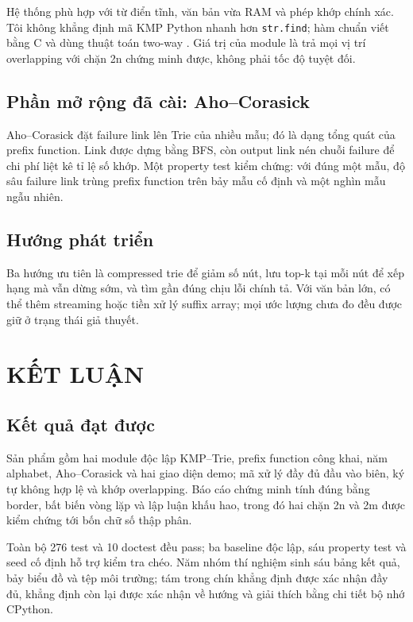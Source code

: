 Hệ thống phù hợp với từ điển tĩnh, văn bản vừa RAM và phép khớp chính
xác. Tôi không khẳng định mã KMP Python nhanh hơn \texttt{str.find};
hàm chuẩn viết bằng C và dùng thuật toán two-way \cite{crochemore1991}.
Giá trị của module là trả mọi vị trí overlapping với chặn 2n chứng minh
được, không phải tốc độ tuyệt đối.

\section{Phần mở rộng đã cài: Aho--Corasick}
\label{sec:7-3}

Aho--Corasick \cite{aho1975} đặt failure link lên Trie của nhiều mẫu;
đó là dạng tổng quát của prefix function. Link được dựng bằng BFS, còn
output link nén chuỗi failure để chi phí liệt kê tỉ lệ số khớp. Một
property test kiểm chứng: với đúng một mẫu, độ sâu failure link trùng
prefix function trên bảy mẫu cố định và một nghìn mẫu ngẫu nhiên.

\section{Hướng phát triển}
\label{sec:7-4}

Ba hướng ưu tiên là compressed trie để giảm số nút, lưu top-k tại mỗi
nút để xếp hạng mà vẫn dừng sớm, và tìm gần đúng chịu lỗi chính tả. Với
văn bản lớn, có thể thêm streaming hoặc tiền xử lý suffix array; mọi
ước lượng chưa đo đều được giữ ở trạng thái giả thuyết.

\chapter{KẾT LUẬN}
\label{ch:8}

\section{Kết quả đạt được}
\label{sec:8-1}

Sản phẩm gồm hai module độc lập KMP--Trie, prefix function công khai,
năm alphabet, Aho--Corasick và hai giao diện demo; mã xử lý đầy đủ đầu
vào biên, ký tự không hợp lệ và khớp overlapping. Báo cáo chứng minh
tính đúng bằng border, bất biến vòng lặp và lập luận khấu hao, trong đó
hai chặn 2n và 2m được kiểm chứng tới bốn chữ số thập phân.

Toàn bộ 276 test và 10 doctest đều pass; ba baseline độc lập, sáu
property test và seed cố định hỗ trợ kiểm tra chéo. Năm nhóm thí nghiệm
sinh sáu bảng kết quả, bảy biểu đồ và tệp môi trường; tám trong chín
khẳng định được xác nhận đầy đủ, khẳng định còn lại được xác nhận về
hướng và giải thích bằng chi tiết bộ nhớ CPython.

